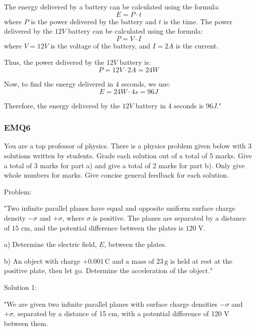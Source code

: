 The energy delivered by a battery can be calculated using the formula:
\[
E = P \cdot t
\]
where $P$ is the power delivered by the battery and $t$ is the time. The power delivered by the $12V$ battery can be calculated using the formula:
\[
P = V \cdot I
\]
where $V = 12V$ is the voltage of the battery, and $I = 2A$ is the current.

Thus, the power delivered by the $12V$ battery is:
\[
P = 12V \cdot 2A = 24W
\]

Now, to find the energy delivered in $4$ seconds, we use:
\[
E = 24W \cdot 4s = 96J
\]

Therefore, the energy delivered by the $12V$ battery in 4 seconds is $96J$."


\subsubsection{EMQ6}

You are a top professor of physics. There is a physics problem given below with 3 solutions written by students. Grade each solution out of a total of 5 marks. Give a total of 3 marks for part a) and give a total of 2 marks for part b). Only give whole numbers for marks. Give concise general feedback for each solution. 

Problem:

"Two infinite parallel planes have equal and opposite uniform surface charge density \( -\sigma \) and \( +\sigma \), where \( \sigma \) is positive. The planes are separated by a distance of \( 15 \) cm, and the potential difference between the plates is \( 120 \) V. 

a) Determine the electric field, \( \underline{E} \), between the plates.

b) An object with charge \( +0.001 \, \text{C} \) and a mass of \( 23 \, \text{g} \) is held at rest at the positive plate, then let go. Determine the acceleration of the object."

Solution 1: 

"We are given two infinite parallel planes with surface charge densities $-\sigma$ and $+\sigma$, separated by a distance of 15 cm, with a potential difference of 120 V between them. 

